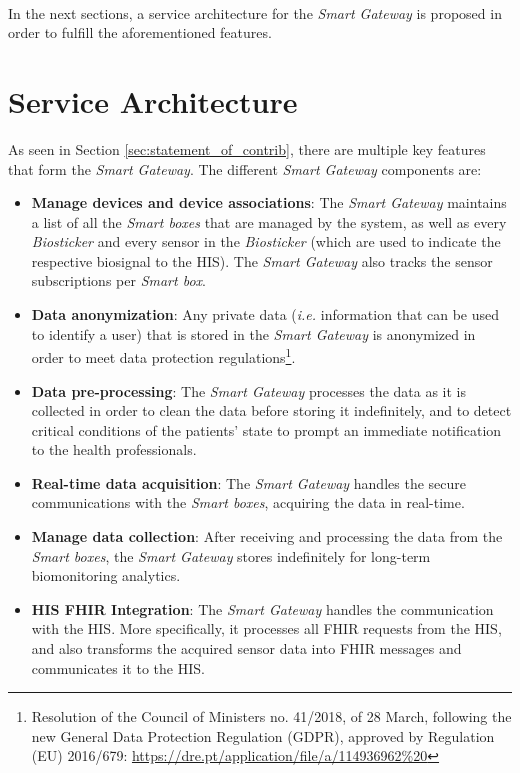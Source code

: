 \paragraph{} In the next sections, a service architecture for the \textit{Smart Gateway} is proposed in order to fulfill the aforementioned features.



\section{Service Architecture}

As seen in Section \ref{sec:statement_of_contrib}, there are multiple key features that form the \textit{Smart Gateway}. The different \textit{Smart Gateway} components are:  

\begin{itemize}
    \item \textbf{Manage devices and device associations}: The \textit{Smart Gateway} maintains a list of all the \textit{Smart boxes} that are managed by the system, as well as every \textit{Biosticker} and every sensor in the \textit{Biosticker} (which are used to indicate the respective biosignal to the \acs{HIS}). The \textit{Smart Gateway} also tracks the sensor subscriptions per \textit{Smart box}.
    \item \textbf{Data anonymization}: Any private data (\textit{i.e.} information that can be used to identify a user) that is stored in the \textit{Smart Gateway} is anonymized in order to meet data protection regulations\footnote{Resolution of the Council of Ministers no. 41/2018, of 28 March, following the new General Data Protection Regulation (GDPR), approved by Regulation (EU) 2016/679:  \url{https://dre.pt/application/file/a/114936962\%20}}. 
    \item \textbf{Data pre-processing}: The \textit{Smart Gateway} processes the data as it is collected in order to clean the data before storing it indefinitely, and to detect critical conditions of the patients' state to prompt an immediate notification to the health professionals.
    \item \textbf{Real-time data acquisition}: The \textit{Smart Gateway} handles the secure communications with the \textit{Smart boxes}, acquiring the data in real-time.
    \item \textbf{Manage data collection}: After receiving and processing the data from the \textit{Smart boxes}, the \textit{Smart Gateway} stores indefinitely for long-term biomonitoring analytics.
    \item \textbf{\acs{HIS} \acs{FHIR} Integration}: The \textit{Smart Gateway} handles the communication with the \acs{HIS}. More specifically, it processes all \acs{FHIR} requests from the \acs{HIS}, and also transforms the acquired sensor data into \acs{FHIR} messages and communicates it to the \acs{HIS}. 
\end{itemize}

